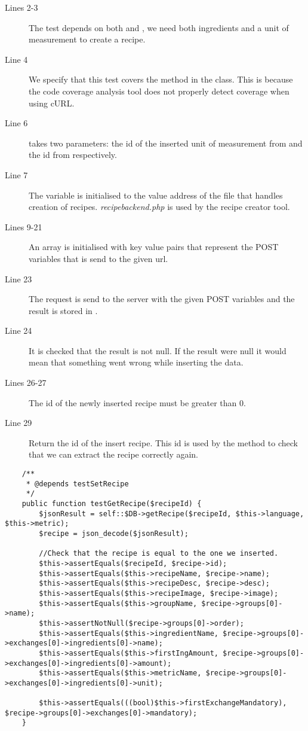 \begin{description}
\item[Lines 2-3] The test depends on both  and , we need both ingredients and a unit of measurement to create a recipe.
\item[Line 4] We specify that this test covers the  method in the  class. This is because the code coverage analysis tool does not properly detect coverage when using cURL.
\item[Line 6]  takes two parameters: the id of the inserted unit of measurement from  and the id from  respectively.
\item[Line 7] The  variable is initialised to the value address of the file that handles creation of recipes. \textit{recipebackend.php} is used by the recipe creator tool.%
\item[Lines 9-21] An array is initialised with key value pairs that represent the POST variables that is send to the given url.
\item[Line 23] The request is send to the server with the given POST variables and the result is stored in .%
\item[Line 24] It is checked that the result is not null. If the result were null it would mean that something went wrong while inserting the data.
\item[Lines 26-27] The id of the newly inserted recipe must be greater than 0.
\item[Line 29] Return the id of the insert recipe. This id is used by the  method to check that we can extract the recipe correctly again.
\end{description}

\begin{lstlisting}
    /**
     * @depends testSetRecipe
     */
    public function testGetRecipe($recipeId) {
        $jsonResult = self::$DB->getRecipe($recipeId, $this->language, $this->metric);
        $recipe = json_decode($jsonResult);

        //Check that the recipe is equal to the one we inserted.
        $this->assertEquals($recipeId, $recipe->id);
        $this->assertEquals($this->recipeName, $recipe->name);
        $this->assertEquals($this->recipeDesc, $recipe->desc);
        $this->assertEquals($this->recipeImage, $recipe->image);
        $this->assertEquals($this->groupName, $recipe->groups[0]->name);
        $this->assertNotNull($recipe->groups[0]->order);
        $this->assertEquals($this->ingredientName, $recipe->groups[0]->exchanges[0]->ingredients[0]->name);
        $this->assertEquals($this->firstIngAmount, $recipe->groups[0]->exchanges[0]->ingredients[0]->amount);
        $this->assertEquals($this->metricName, $recipe->groups[0]->exchanges[0]->ingredients[0]->unit);

        $this->assertEquals(((bool)$this->firstExchangeMandatory), $recipe->groups[0]->exchanges[0]->mandatory);
    }
\end{lstlisting}%

